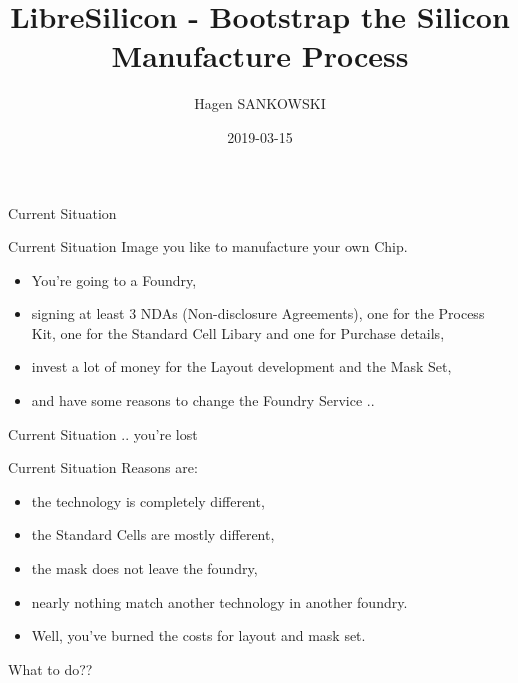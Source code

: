 \documentclass{beamer}
\title[Libre Silicon]{LibreSilicon - Bootstrap the Silicon Manufacture Process} %
\author{Hagen SANKOWSKI} %
\institute[Chipforge] %
{
Chipforge\\ %
\medskip
\textit{hsank@nospam.chipforge.org} %
}
\date{2019-03-15} %
\begin{document}
\begin{frame}
\titlepage %
\end{frame}


\begin{frame}
Current Situation
\end{frame}

\begin{frame}{Current Situation}
Image you like to manufacture your own Chip.
\begin{itemize}
\item You're going to a Foundry,
\item signing at least 3 NDAs (Non-disclosure Agreements), one for the Process Kit, one for the Standard Cell Libary and one for Purchase details,
\item invest a lot of money for the Layout development and the Mask Set,
\item and have some reasons to change the Foundry Service ..
\end{itemize}
\end{frame}

\begin{frame}{Current Situation}
.. you're lost
\end{frame}

\begin{frame}{Current Situation}
Reasons are:
\begin{itemize}
\item the technology is completely different,
\item the Standard Cells are mostly different,
\item the mask does not leave the foundry,
\item nearly nothing match another technology in another foundry.
\item Well, you've burned the costs for layout and mask set.
\end{itemize}
\end{frame}

\begin{frame}
What to do??
\end{frame}
\end{document}
